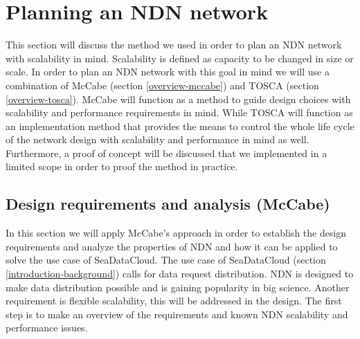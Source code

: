 \section{Planning an NDN network}
\label{planning-ndn}
This section will discuss the method we used in order to plan an NDN network with scalability in mind. Scalability is defined as capacity to be changed in size or scale. In order to plan an NDN network with this goal in mind we will use a combination of McCabe (section \ref{overview-mccabe}) and TOSCA (section \ref{overview-tosca}). McCabe will function as a method to guide design choices with scalability and performance requirements in mind. While TOSCA will function as an implementation method that provides the means to control the whole life cycle of the network design with scalability and performance in mind as well. Furthermore, a proof of concept will be discussed that we implemented in a limited scope in order to proof the method in practice.

\subsection{Design requirements and analysis (McCabe)}
\label{planning-requirements}
In this section we will apply McCabe's approach in order to establish the design requirements and analyze the properties of NDN and how it can be applied to solve the use case of SeaDataCloud. The use case of SeaDataCloud (section \ref{introduction-background}) calls for data request distribution. NDN is designed to make data distribution possible and is gaining popularity in big science. Another requirement is flexible scalability, this will be addressed in the design. The first step is to make an overview of the requirements and known NDN scalability and performance issues.

